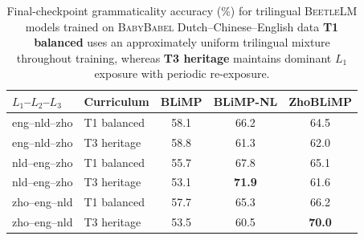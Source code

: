  \begin{table}[t]
\centering\small
\setlength{\tabcolsep}{5pt}
\begin{tabular}{llccc}
\toprule
\textbf{$L_1$--$L_2$--$L_3$} & \textbf{Curriculum} & \textbf{BLiMP} & \textbf{BLiMP-NL} & \textbf{ZhoBLiMP} \\
\midrule
eng--nld--zho & T1 balanced & 58.1 & 66.2 & 64.5 \\
eng--nld--zho & T3 heritage & 58.8 & 61.3 & 62.0 \\
\midrule
nld--eng--zho & T1 balanced & 55.7 & 67.8 & 65.1 \\
nld--eng--zho & T3 heritage & 53.1 & \textbf{71.9} & 61.6 \\
\midrule
zho--eng--nld & T1 balanced & 57.7 & 65.3 & 66.2 \\
zho--eng--nld & T3 heritage & 53.5 & 60.5 & \textbf{70.0} \\
\bottomrule
\end{tabular}
\caption{Final-checkpoint grammaticality accuracy (\%) for trilingual \textsc{BeetleLM} models trained on \textsc{BabyBabel} Dutch--Chinese--English data \citep{jumelet2025babybabellmmultilingualbenchmarkdevelopmentally} \textbf{T1 balanced} uses an approximately uniform trilingual mixture throughout training, whereas \textbf{T3 heritage} maintains dominant $L_1$ exposure with periodic re-exposure. }
\label{tab:trilingual_minimal}
\end{table}
